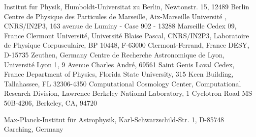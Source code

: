 \documentclass{aastex}   	%
\begin{document}
{
    Institut fur Physik,  Humboldt-Universitat zu Berlin,
    Newtonstr. 15, 12489 Berlin
}
{
    Centre de Physique des Particules de Marseille, 
    Aix-Marseille Universit\'e , CNRS/IN2P3, 
    163 avenue de Luminy - Case 902 - 13288 Marseille Cedex 09, France
}
{
    Clermont Universit\'e, Universit\'e Blaise Pascal, CNRS/IN2P3, Laboratoire de Physique Corpusculaire,
    BP 10448, F-63000 Clermont-Ferrand, France
}
{
    DESY, D-15735 Zeuthen, Germany
}
{
    Centre de Recherche Astronomique de Lyon, Universit\'e Lyon 1,
    9 Avenue Charles Andr\'e, 69561 Saint Genis Laval Cedex, France
}
{
    Department of Physics, Florida State University,
    315 Keen Building, Tallahassee, FL 32306-4350
}
{
    Computational Cosmology Center, Computational Research Division, Lawrence Berkeley National Laboratory, 
    1 Cyclotron Road MS 50B-4206, Berkeley, CA, 94720
}

{
    Max-Planck-Institut f\"ur Astrophysik, Karl-Schwarzschild-Str. 1,
D-85748 Garching, Germany
}

\begin{abstract}
An empirical model for SN~Ia peak magnitudes with two color parameters and dependence on the equivalent widths of CaII, SiII, and SiII velocity
is applied to the supernova sample of the Nearby Supernova Factory.  The peak magnitudes and their colors are found to be significantly
dependent on the spectral equivalent widths, and two independent color parameters.  One parameter, interpreted as due to extrinsic host-galaxy
dust extinction, is consistent with an $R_V=2.5$  \citet{1999PASP..111...63F} dust model.  The second parameter is inconsistent with dust and
is inferred to have origins intrinsic to supernovae.  Our model explains features of external data, such as the wide range of inferred $R_V$ among
SNe~Ia, the low  $R_V$ of redder supernovae, the colors of SN~2014J, and the color-dependent residuals in Hubble diagrams.
\end{abstract}

\end{document}
